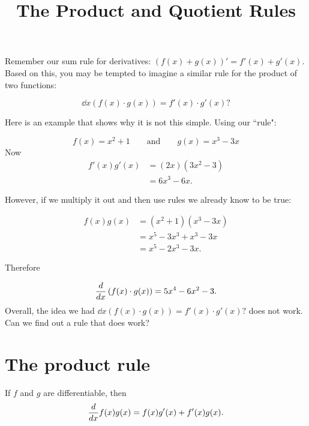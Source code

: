 \documentclass{ximera}
\title{The Product and Quotient Rules}
\begin{document}
\begin{abstract}
\end{abstract}
\maketitle

Remember our sum rule for derivatives: $(f(x)+g(x))'=f'(x)+g'(x)$. Based on this, you may be tempted to imagine a similar rule for the product of two functions:

  \[
  \dd{x} \left(f(x)\cdot g(x)\right) = f'(x) \cdot g'(x)?
  \]

Here is an example that shows why it is not this simple. Using our ``rule":

  \[
  f(x) = x^2+1\qquad\text{and}\qquad g(x) = x^3-3x
  \]
  Now
  \begin{align*}
    f'(x)g'(x) &= (2x)(3x^2-3)\\
    &= 6x^3-6x.
  \end{align*}

However, if we multiply it out and then use rules we already know to be true:

  \begin{align*}
    f(x)g(x) &= (x^2+1)(x^3-3x)\\
    &=x^5-3x^3+x^3-3x\\
    &=x^5-2x^3-3x.
  \end{align*} 

Therefore

  \[
  \frac{d}{\mathop{}\!d x} \left(f(x) \cdot g(x)\right) = 5x^4-6x^2-3.
  \]
Overall, the idea we had $  \dd{x} \left(f(x)\cdot g(x)\right) = f'(x) \cdot g'(x)?$ does not work. Can we find out a rule that does work?

\section{The product rule}

\begin{theorem}\label{theorem:product-rule}
If $f$ and $g$ are differentiable, then
\[
\frac{d}{\mathop{}\!d x} f(x)g(x) = f(x)g'(x)+f'(x)g(x).
\]
\end{theorem}

\end{document}
